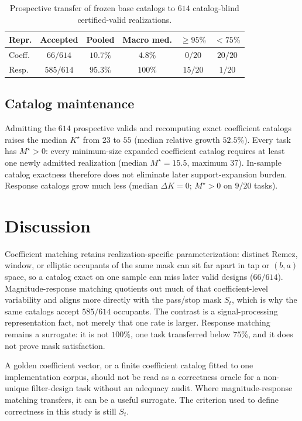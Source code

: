 \documentclass{article}
\begin{document}
\begin{table}[t]
\caption{Prospective transfer of frozen base catalogs to $614$
catalog-blind certified-valid realizations.}
\label{tab:xfer}
\centering
\setlength{\tabcolsep}{3.6pt}
\begin{tabular}{lccccc}
\toprule
Repr. & Accepted & Pooled & Macro med. & ${\ge}95\%$ & ${<}75\%$ \\
\midrule
Coeff. & $66/614$ & $10.7\%$ & $4.8\%$ & $0/20$ & $20/20$ \\
Resp.  & $585/614$ & $95.3\%$ & $100\%$ & $15/20$ & $1/20$ \\
\bottomrule
\end{tabular}
\end{table}

\subsection{Catalog maintenance}
Admitting the $614$ prospective valids and recomputing exact
coefficient catalogs raises the median $K^\star$ from $23$ to
$55$ (median relative growth $52.5\%$).
Every task has $M^\star>0$: every minimum-size expanded
coefficient catalog requires at least one newly admitted
realization (median $M^\star=15.5$, maximum $37$).
In-sample catalog exactness therefore does not eliminate later
support-expansion burden.
Response catalogs grow much less (median $\Delta K=0$;
$M^\star>0$ on $9/20$ tasks).

\section{Discussion}
\label{sec:disc}

Coefficient matching retains realization-specific
parameterization: distinct Remez, window, or elliptic
occupants of the same mask can sit far apart in tap or
$(b,a)$ space, so a catalog exact on one sample can miss later
valid designs ($66/614$).
Magnitude-response matching quotients out much of that
coefficient-level variability and aligns more directly with the
pass/stop mask $S_t$, which is why the same catalogs accept
$585/614$ occupants.
The contrast is a signal-processing representation fact, not
merely that one rate is larger.
Response matching remains a surrogate: it is not $100\%$, one
task transferred below $75\%$, and it does not prove mask
satisfaction.

A golden coefficient vector, or a finite coefficient catalog
fitted to one implementation corpus, should not be read as a
correctness oracle for a non-unique filter-design task without an
adequacy audit.
Where magnitude-response matching transfers, it can be a useful
surrogate.
The criterion used to define correctness in this study is still
$S_t$.
\end{document}
